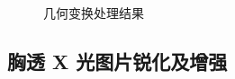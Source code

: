 \documentclass[11pt]{ctexart}
\begin{document}
\begin{figure}[htbp]
{\begin{minipage}[t]{0.4\linewidth}
    \end{minipage}
    }
    \centering
    \caption{几何变换处理结果}\label{fig:digit}
  \end{figure}

\newpage

\subsection*{胸透 X 光图片锐化及增强}
\end{document}
